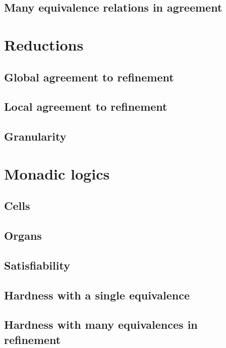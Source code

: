 \documentclass{scrbook}
\begin{document}
\section{Many equivalence relations in agreement}



\chapter{Reductions}


\section{Global agreement to refinement}


\section{Local agreement to refinement}


\section{Granularity}\label{sec:granularity}


\chapter{Monadic logics}\label{ch:monadic-firstorder}


\section{Cells}


\section{Organs}


\section{Satisfiability}


\section{Hardness with a single equivalence}\label{sec:hardness-one}


\section{Hardness with many equivalences in refinement}




\end{document}
